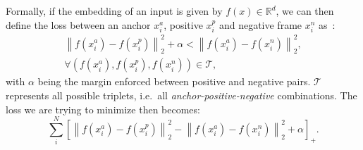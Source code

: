 \documentclass[\home/main.tex]{subfiles}
\begin{document}
Formally, if the embedding of an input is given by $f(x) \in \mathbb{R}^d$, we can then define the loss between an anchor $x_i^a$, positive $x_i^p$ and negative frame $x_i^n$ as~\cite{FaceNet}:
\begin{align}
    \left\|f\left(x_{i}^{a}\right)-f\left(x_{i}^{p}\right)\right\|_{2}^{2}+\alpha<\left\|f\left(x_{i}^{a}\right)-f\left(x_{i}^{n}\right)\right\|_{2}^{2} \nonumber, \\
    \forall\left(f\left(x_{i}^{a}\right), f\left(x_{i}^{p}\right), f\left(x_{i}^{n}\right)\right) \in \mathcal{T},    \nonumber
\end{align}
with $\alpha$ being the margin enforced between positive and negative pairs. $\mathcal{T}$ represents all possible triplets, i.e.\ all \textit{anchor-positive-negative} combinations. The loss we are trying to minimize then becomes:
\begin{equation*}
    \sum_{i}^{N}\left[\left\|f\left(x_{i}^{a}\right)-f\left(x_{i}^{p}\right)\right\|_{2}^{2}-\left\|f\left(x_{i}^{a}\right)-f\left(x_{i}^{n}\right)\right\|_{2}^{2}+\alpha\right]_{+}.
\end{equation*}

\end{document}
